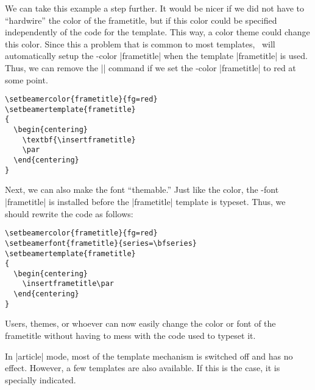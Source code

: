 We can take this example a step further. It would be nicer if we did
not have to ``hardwire'' the color of the frametitle, but if this
color could be specified independently of the code for the
template. This way, a color theme could change this color. Since this
a problem that is common to most templates, \beamer\ will
automatically setup the \beamer-color |frametitle| when the template
|frametitle| is used. Thus, we can remove the |\color{red}| command if
we set the \beamer-color |frametitle| to red at some point.
\begin{verbatim}
\setbeamercolor{frametitle}{fg=red}
\setbeamertemplate{frametitle}
{
  \begin{centering}
    \textbf{\insertframetitle}
    \par
  \end{centering}
}
\end{verbatim}
Next, we can also make the font ``themable.'' Just like the color, the
\beamer-font |frametitle| is installed before the |frametitle|
template is typeset. Thus, we should rewrite the code as follows:
\begin{verbatim}
\setbeamercolor{frametitle}{fg=red}
\setbeamerfont{frametitle}{series=\bfseries}
\setbeamertemplate{frametitle}
{
  \begin{centering}
    \insertframetitle\par
  \end{centering}
}
\end{verbatim}
Users, themes, or whoever can now easily change the color or font of
the frametitle without having to mess with the code used to typeset
it.

\articlenote
In |article| mode, most of the template mechanism is switched off and
has no effect. However, a few templates are also available. If this is
the case, it is specially indicated.
\smallskip

